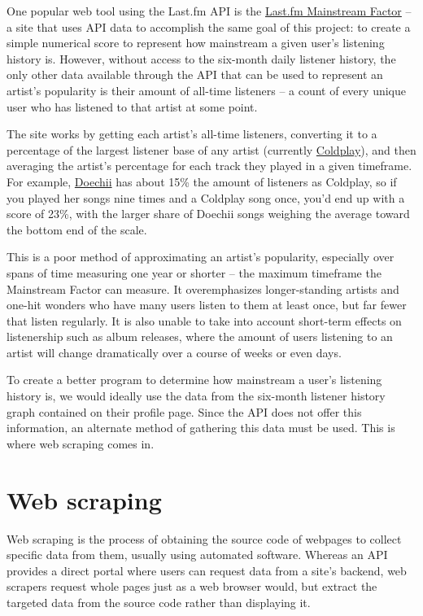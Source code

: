 One popular web tool using the Last.fm API is the \href{https://mainstream.ghan.nl/}{Last.fm Mainstream Factor} -- a site that uses API data to accomplish the same goal of this project: to create a simple numerical score to represent how mainstream a given user's listening history is. However, without access to the six-month daily listener history, the only other data available through the API that can be used to represent an artist's popularity is their amount of all-time listeners -- a count of every unique user who has listened to that artist at some point.

The site works by getting each artist's all-time listeners, converting it to a percentage of the largest listener base of any artist (currently \href{https://www.last.fm/music/Coldplay}{Coldplay}), and then averaging the artist's percentage for each track they played in a given timeframe. For example, \href{https://www.last.fm/music/Doechii}{Doechii} has about 15\% the amount of listeners as Coldplay, so if you played her songs nine times and a Coldplay song once, you'd end up with a score of 23\%, with the larger share of Doechii songs weighing the average toward the bottom end of the scale.

This is a poor method of approximating an artist's popularity, especially over spans of time measuring one year or shorter --  the maximum timeframe the Mainstream Factor can measure. It overemphasizes longer-standing artists and one-hit wonders who have many users listen to them at least once, but far fewer that listen regularly. It is also unable to take into account short-term effects on listenership such as album releases, where the amount of users listening to an artist will change dramatically over a course of weeks or even days.

To create a better program to determine how mainstream a user's listening history is, we would ideally use the data from the six-month listener history graph contained on their profile page. Since the API does not offer this information, an alternate method of gathering this data must be used. This is where web scraping comes in.

\section{Web scraping}

Web scraping is the process of obtaining the source code of webpages to collect specific data from them, usually using automated software. Whereas an API provides a direct portal where users can request data from a site's backend, web scrapers request whole pages just as a web browser would, but extract the targeted data from the source code rather than displaying it.

